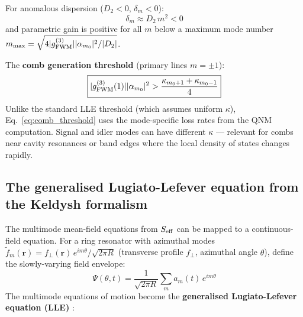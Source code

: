 \documentclass[12pt]{article}
\begin{document}
For anomalous dispersion ($D_2 < 0$, $\delta_m < 0$):
\begin{equation}
  \delta_m \approx D_2\,m^2 < 0
  \label{eq:phase_mismatch}
\end{equation}
and parametric gain is positive for all $m$ below a maximum mode
number $m_{\rm max} = \sqrt{4|g^{(3)}_{\rm FWM}||\alpha_{m_0}|^2/|D_2|}$.

The \textbf{comb generation threshold} (primary lines $m=\pm 1$):
\begin{equation}
  \boxed{
  |g^{(3)}_{\rm FWM}(1)||\alpha_{m_0}|^2
  > \frac{\kappa_{m_0+1} + \kappa_{m_0-1}}{4}
  }
  \label{eq:comb_threshold}
\end{equation}
Unlike the standard LLE threshold (which assumes uniform $\kappa$),
Eq.~\eqref{eq:comb_threshold} uses the mode-specific loss rates from
the QNM computation.  Signal and idler modes can have different $\kappa$
--- relevant for combs near cavity resonances or band edges where the
local density of states changes rapidly.

\subsection{The generalised Lugiato-Lefever equation from the Keldysh formalism}

The multimode mean-field equations from $S_{\rm eff}$ can be mapped to
a continuous-field equation.  For a ring resonator with azimuthal modes
$\tilde{f}_m(\mathbf{r}) = f_\perp(\mathbf{r})\,e^{im\theta}/\sqrt{2\pi R}$
(transverse profile $f_\perp$, azimuthal angle $\theta$), define the
slowly-varying field envelope:
\begin{equation}
  \Psi(\theta,t) = \frac{1}{\sqrt{2\pi R}}\sum_m a_m(t)\,e^{im\theta}
  \label{eq:field_envelope}
\end{equation}
The multimode equations of motion become the
\textbf{generalised Lugiato-Lefever equation (LLE)} \cite{LugiatoLefever1987}:
\end{document}
